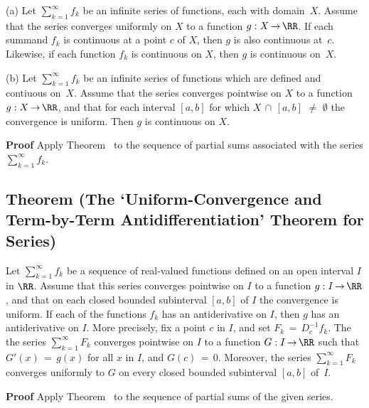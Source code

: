\V

        (a) Let $\sum_{k=1}^{{\infty}} f_{k}$ be an infinite series of functions, each with domain~$X$.
    Assume that the series converges uniformly on $X$ to a function $g:X \,{\rightarrow}\, {\RR}$.
    If each summand $f_{k}$ is continuous at a point $c$ of $X$, then $g$ is also continuous at~$c$. Likewise, if each function $f_{k}$ is continuous on $X$, then $g$ is continuous on~$X$.

\V

        (b) Let $\sum_{k=1}^{{\infty}} f_{k}$ be an infinite series of functions which are defined and contiuous on~$X$.
    Assume that the series converges pointwise on $X$ to a function $g:X \,{\rightarrow}\, {\RR}$,
    and that for each interval $[a,b]$ for which $X\,{\cap}\,[a,b] \,\,{\neq}\,\, {\emptyset}$ the convergence is uniform.
    Then $g$ is continuous on $X$.

\V

        {\bf Proof} Apply Theorem~ to the sequence of partial sums associated with the series $\sum_{k=1}^{{\infty}} f_{k}$.

\V


        \subsection{\small{{\bf Theorem}} (The `Uniform-Convergence and Term-by-Term Antidifferentiation' Theorem for Series)}
        \label{ThmG60.50}

\V

        Let $\sum_{k=1}^{{\infty}} f_{k}$ be a sequence of real-valued functions defined on an open interval $I$ in ${\RR}$.
    Assume that this series converges pointwise on $I$ to a function $g:I \,{\rightarrow}\, {\RR}$, and that on each closed bounded subinterval $[a,b]$ of $I$ the convergence is uniform.
    If each of the functions $f_{k}$ has an antiderivative on $I$, then $g$ has an antiderivative on $I$.
    More precisely, fix a point $c$ in $I$, and set $F_{k} \,=\, D^{-1}_{c} f_{k}$.
    The the series $\sum_{k=1}^{{\infty}} F_{k}$ converges pointwise on $I$ to a function $G:I \,{\rightarrow}\, {\RR}$ such that $G'(x) \,=\, g(x)$ for all $x$ in $I$, and $G(c) \,=\, 0$.
    Moreover, the series $\sum_{k=1}^{{\infty}} F_{k}$ converges uniformly to $G$ on every closed bounded subinterval $[a,b]$ of~$I$.

\V

        {\bf Proof} Apply Theorem~ to the sequence of partial sums of the given series.

